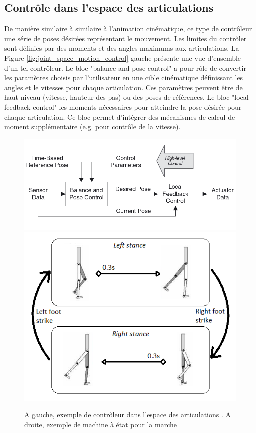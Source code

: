 \documentclass{llncs}
\begin{document}
\subsection{Contrôle dans l'espace des articulations} 
De manière similaire à similaire à l'animation cinématique, ce type de contrôleur une série de poses désirées représentant le mouvement. Les limites du contrôler sont définies par des moments et des angles maximums aux articulations. La Figure \ref{fig:joint_space_motion_control} gauche présente une vue d'ensemble d'un tel contrôleur. Le bloc "balance and pose control" a pour rôle de convertir les paramètres choisis par l'utilisateur en une cible cinématique définissant les angles et le vitesses pour chaque articulation. Ces paramètres peuvent être de haut niveau (vitesse, hauteur des pas) ou des poses de références. Le bloc "local feedback control" les moments nécessaires pour atteindre la pose désirée pour chaque articulation. Ce bloc permet d'intégrer des mécanismes de calcul de moment supplémentaire (e.g. pour contrôle de la vitesse). 
\begin{figure}[h]
\centering
\includegraphics[scale=0.4]{joint_space_motion_control.png}
\includegraphics[scale=0.5]{state_machine.png}
\caption{A gauche, exemple de contrôleur dans l'espace des articulations \cite{geijtenbeek2012interactive}. A droite, exemple de machine à état pour la marche \cite{yin2007simbicon}}
\label{fig:joint_space_motion_control}
\label{fig:state_machine}
\end{figure}
\end{document}
